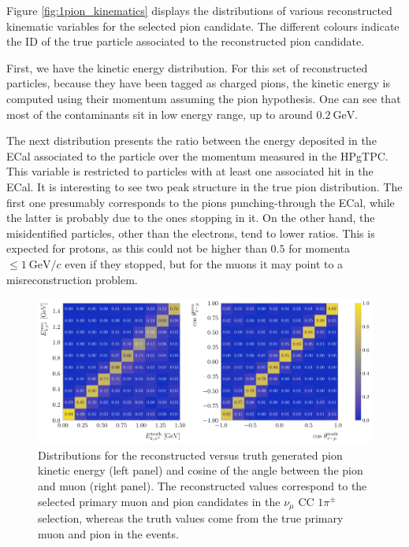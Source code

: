 Figure \ref{fig:1pion_kinematics} displays the distributions of various reconstructed kinematic variables for the selected pion candidate. The different colours indicate the ID of the true particle associated to the reconstructed pion candidate.

First, we have the kinetic energy distribution. For this set of reconstructed particles, because they have been tagged as charged pions, the kinetic energy is computed using their momentum assuming the pion hypothesis. One can see that most of the contaminants sit in low energy range, up to around $0.2~\mathrm{GeV}$.

The next distribution presents the ratio between the energy deposited in the ECal associated to the particle over the momentum measured in the HPgTPC. This variable is restricted to particles with at least one associated hit in the ECal. It is interesting to see two peak structure in the true pion distribution. The first one presumably corresponds to the pions punching-through the ECal, while the latter is probably due to the ones stopping in it. On the other hand, the misidentified particles, other than the electrons, tend to lower ratios. This is expected for protons, as this could not be higher than $0.5$ for momenta $\leq 1~\mathrm{GeV}/c$ even if they stopped, but for the muons it may point to a misreconstruction problem.

\begin{figure}[t]
    \centering
    \includegraphics[width=.99\linewidth]{Images/GAr_selection/pion_selection_1pion_kinematic_comp.pdf}
    \caption[Distributions for the reconstructed versus truth pion kinetic energy and angle between the pion and muon in the $\nu_{\mu}$ CC $1\pi^{\pm}$ selection.]{Distributions for the reconstructed versus truth generated pion kinetic energy (left panel) and cosine of the angle between the pion and muon (right panel). The reconstructed values correspond to the selected primary muon and pion candidates in the $\nu_{\mu}$ CC $1\pi^{\pm}$ selection, whereas the truth values come from the true primary muon and pion in the events.}
    \label{fig:1pion_kinematic_comp}
\end{figure}

